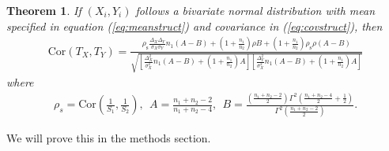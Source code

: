 \documentclass[12pt, a4paper]{article}
\newtheorem{theorem}{Theorem}       %
\begin{document}
	
%	
%	
	
	

	\begin{theorem}\label{thm:tstat}
		If $(X_i, Y_i)$ follows a bivariate normal distribution with mean specified in equation (\ref{eq:meanstruct}) and covariance in (\ref{eq:covstruct}), then 
			\begin{align}\label{eq:ttestcor}
			\text{Cor}(T_X, T_Y)  = \frac{\rho_{\text{s}}\frac{\Delta_X\Delta_Y}{\sigma_X\sigma_Y}n_1(A-B) + (1 + \frac{n_1}{n_2}) \rho B
				+ (1 + \frac{n_1}{n_2})\rho_{\text{s}}\rho(A-B)}{\sqrt{\left[ \frac{\Delta_X^2}{\sigma_X^2}n_1(A-B) + (1 + \frac{n_1}{n_2})
					A\right]\left[\frac{\Delta_Y^2}{\sigma_X^2}n_1(A-B) + (1 + \frac{n_1}{n_2}) A\right]}}
			\end{align}
			 where 
			 \begin{align}\label{eq:AandB}
			 \rho_s = \text{Cor}(\frac{1}{S_1}, \frac{1}{S_2}), ~~A = \frac{n_1 + n_2-2}{n_1 + n_2-4}, ~~B =
			 \frac{(\frac{n_1 + n_2 -2}{2})\Gamma^2(\frac{n_1 + n_2 -4}{2} + \frac{1}{2})}{\Gamma^2(\frac{n_1+ n_2 -2}{2})}.
			 \end{align}
			 
	\end{theorem}



	We will prove this in the methods section.
	
\end{document}
